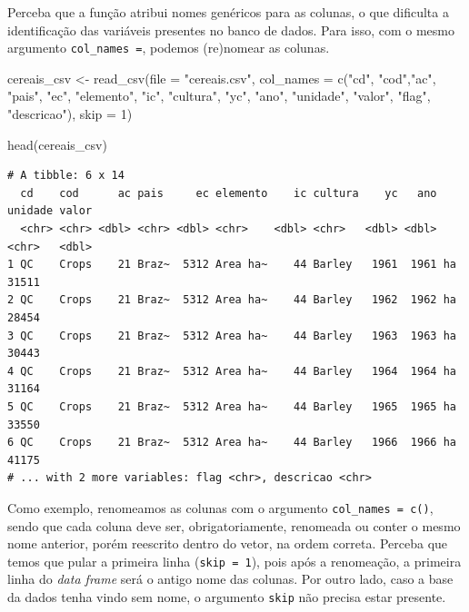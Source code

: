 \documentclass[
  brazilian,
]{book}
\newenvironment{Shaded}{\begin{snugshade}}{\end{snugshade}}
\newcommand{\AttributeTok}[1]{\textcolor[rgb]{0.77,0.63,0.00}{#1}}
\newcommand{\DecValTok}[1]{\textcolor[rgb]{0.00,0.00,0.81}{#1}}
\newcommand{\FunctionTok}[1]{\textcolor[rgb]{0.00,0.00,0.00}{#1}}
\newcommand{\NormalTok}[1]{#1}
\newcommand{\OtherTok}[1]{\textcolor[rgb]{0.56,0.35,0.01}{#1}}
\newcommand{\StringTok}[1]{\textcolor[rgb]{0.31,0.60,0.02}{#1}}
\begin{document}
Perceba que a função atribui nomes genéricos para as colunas, o que dificulta a identificação das variáveis presentes no banco de dados. Para isso, com o mesmo argumento \texttt{col\_names\ =}, podemos (re)nomear as colunas.

\begin{Shaded}
\begin{Highlighting}[]
\NormalTok{cereais\_csv }\OtherTok{\textless{}{-}} \FunctionTok{read\_csv}\NormalTok{(}\AttributeTok{file =} \StringTok{"cereais.csv"}\NormalTok{,}
                        \AttributeTok{col\_names =} \FunctionTok{c}\NormalTok{(}\StringTok{"cd"}\NormalTok{, }\StringTok{"cod"}\NormalTok{,}\StringTok{"ac"}\NormalTok{, }\StringTok{"pais"}\NormalTok{, }\StringTok{"ec"}\NormalTok{,}
                                      \StringTok{"elemento"}\NormalTok{, }\StringTok{"ic"}\NormalTok{, }\StringTok{"cultura"}\NormalTok{, }\StringTok{"yc"}\NormalTok{,}
                                      \StringTok{"ano"}\NormalTok{, }\StringTok{"unidade"}\NormalTok{, }\StringTok{"valor"}\NormalTok{, }\StringTok{"flag"}\NormalTok{,}
                                      \StringTok{"descricao"}\NormalTok{),}
                        \AttributeTok{skip =} \DecValTok{1}\NormalTok{)}

\FunctionTok{head}\NormalTok{(cereais\_csv)}
\end{Highlighting}
\end{Shaded}

\begin{verbatim}
# A tibble: 6 x 14
  cd    cod      ac pais     ec elemento    ic cultura    yc   ano unidade valor
  <chr> <chr> <dbl> <chr> <dbl> <chr>    <dbl> <chr>   <dbl> <dbl> <chr>   <dbl>
1 QC    Crops    21 Braz~  5312 Area ha~    44 Barley   1961  1961 ha      31511
2 QC    Crops    21 Braz~  5312 Area ha~    44 Barley   1962  1962 ha      28454
3 QC    Crops    21 Braz~  5312 Area ha~    44 Barley   1963  1963 ha      30443
4 QC    Crops    21 Braz~  5312 Area ha~    44 Barley   1964  1964 ha      31164
5 QC    Crops    21 Braz~  5312 Area ha~    44 Barley   1965  1965 ha      33550
6 QC    Crops    21 Braz~  5312 Area ha~    44 Barley   1966  1966 ha      41175
# ... with 2 more variables: flag <chr>, descricao <chr>
\end{verbatim}

Como exemplo, renomeamos as colunas com o argumento \texttt{col\_names\ =\ c()}, sendo que cada coluna deve ser, obrigatoriamente, renomeada ou conter o mesmo nome anterior, porém reescrito dentro do vetor, na ordem correta. Perceba que temos que pular a primeira linha (\texttt{skip\ =\ 1}), pois após a renomeação, a primeira linha do \emph{data frame} será o antigo nome das colunas. Por outro lado, caso a base da dados tenha vindo sem nome, o argumento \texttt{skip} não precisa estar presente.
\end{document}
